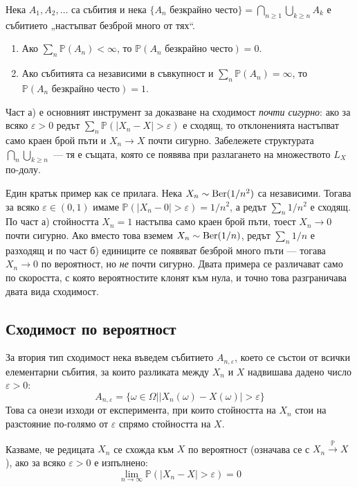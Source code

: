 \begin{supp}\label{supp:borel-cantelli}
Нека $A_1, A_2, \dots$ са събития и нека
$\{A_n \text{ безкрайно често}\} = \bigcap_{n \ge 1} \bigcup_{k \ge n} A_k$ е събитието
„настъпват безброй много от тях“.
\begin{enumerate}
    \item[а)] Ако $\sum_{n} \mathbb{P}(A_n) < \infty$, то
    $\mathbb{P}(A_n \text{ безкрайно често}) = 0$.
    \item[б)] Ако събитията са независими в съвкупност и $\sum_{n} \mathbb{P}(A_n) = \infty$,
    то $\mathbb{P}(A_n \text{ безкрайно често}) = 1$.
\end{enumerate}
Част а) е основният инструмент за доказване на сходимост \emph{почти сигурно}: ако за всяко
$\varepsilon > 0$ редът $\sum_n \mathbb{P}(|X_n - X| > \varepsilon)$ е сходящ, то отклоненията
настъпват само краен брой пъти и $X_n \to X$ почти сигурно. Забележете структурата
$\bigcap_n \bigcup_{k \ge n}$ — тя е същата, която се появява при разлагането на множеството
$L_X$ по-долу.

Един кратък пример как се прилага. Нека $X_n \sim \operatorname{Ber}(1/n^2)$ са независими. Тогава за
всяко $\varepsilon \in (0,1)$ имаме $\mathbb{P}(|X_n - 0| > \varepsilon) = 1/n^2$, а редът
$\sum_n 1/n^2$ е сходящ. По част а) стойността $X_n = 1$ настъпва само краен брой пъти,
тоест $X_n \to 0$ почти сигурно. Ако вместо това вземем $X_n \sim \operatorname{Ber}(1/n)$, редът
$\sum_n 1/n$ е разходящ и по част б) единиците се появяват безброй много пъти — тогава
$X_n \to 0$ по вероятност, но \emph{не} почти сигурно. Двата примера се различават само по
скоростта, с която вероятностите клонят към нула, и точно това разграничава двата вида
сходимост.
\end{supp}

\subsection{Сходимост по вероятност}

За втория тип сходимост нека въведем събитието $A_{n, \varepsilon}$, което се състои от всички елементарни събития, за които разликата между $X_n$ и $X$ надвишава дадено число $\varepsilon > 0$:
\[
A_{n, \varepsilon} = \{ \omega \in \Omega \mathrel{\big|} |X_n(\omega) - X(\omega)| > \varepsilon \}
\]
Това са онези изходи от експеримента, при които стойността на $X_n$ стои на разстояние по-голямо от $\varepsilon$ спрямо стойността на $X$.

\begin{defn}
Казваме, че редицата $X_n$ се схожда към $X$ по вероятност (означава се с $X_n \xrightarrow{\mathbb{P}} X$), ако за всяко $\varepsilon > 0$ е изпълнено:
\[
\lim_{n \to \infty} \mathbb{P}(|X_n - X| > \varepsilon) = 0
\]
\end{defn}

